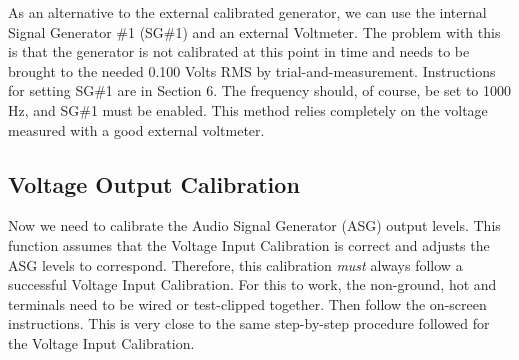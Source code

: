 As an alternative to the external calibrated generator,  we can use the internal Signal Generator \#1 (SG\#1) and an external Voltmeter.  The problem with this is that the generator is not calibrated at this point in time and needs to be brought to the needed 0.100 Volts RMS by trial-and-measurement.  Instructions for setting SG\#1 are in Section 6.  The frequency should, of course, be set to 1000 Hz, and SG\#1 must be enabled.   This method relies completely on the voltage measured with a good external voltmeter.

\subsection{Voltage Output Calibration} Now we need to calibrate the Audio Signal Generator (ASG) output levels.  This function assumes that the Voltage Input Calibration is correct and adjusts the ASG levels to correspond.  Therefore, this calibration \textit{must} always follow a successful Voltage Input Calibration.  For this to work, the non-ground, hot  and  terminals need to be wired  or test-clipped together.  Then follow the on-screen instructions.  This is very close to the same step-by-step procedure followed for the Voltage Input Calibration. 

